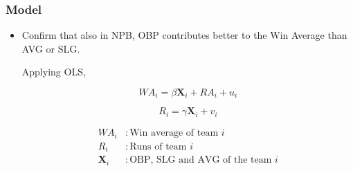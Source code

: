 \documentclass[dvipdfmx,12pt]{beamer}
\begin{document}
\begin{frame}\frametitle{Model}

 \begin{itemize}
 
 \item Confirm that also in NPB, OBP contributes better to the Win Average than AVG or SLG.
 
 Applying OLS,
 
 \[\textit{WA}_i = \beta \mathbf{X}_i + \textit{RA}_i + u_i \]
 
 \[\textit{R}_i = \gamma \mathbf{X}_i + v_i \]
  
  \begin{align*}
  \textit{WA}_i &: \text{Win average of team } i \\
  \textit{R}_i &: \text{Runs of team } i \\
  \mathbf{X}_i &: \text{OBP, SLG and AVG of the team } i
  \end{align*}
 
 \end{itemize}

\end{frame}
\end{document}
